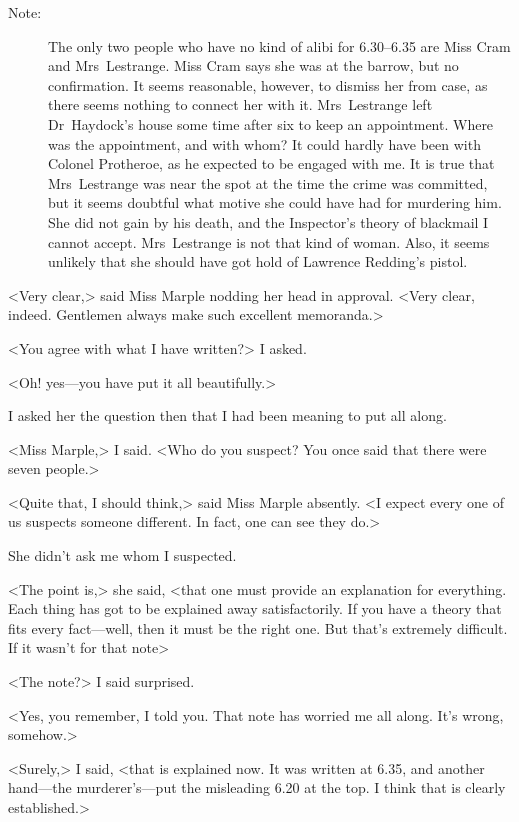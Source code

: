 	\begin{description}
\item[Note:] The only two people who have no kind of alibi for 6.30--6.35 are Miss Cram and Mrs~Lestrange. Miss Cram says she was at the barrow, but no confirmation. It seems reasonable, however, to dismiss her from case, as there seems nothing to connect her with it. Mrs~Lestrange left Dr~Haydock's house some time after six to keep an appointment. Where was the appointment, and with whom? It could hardly have been with Colonel Protheroe, as he expected to be engaged with me. It is true that Mrs~Lestrange was near the spot at the time the crime was committed, but it seems doubtful what motive she could have had for murdering him. She did not gain by his death, and the Inspector's theory of blackmail I cannot accept. Mrs~Lestrange is not that kind of woman. Also, it seems unlikely that she should have got hold of Lawrence Redding's pistol.
\end{description}

<Very clear,> said Miss Marple nodding her head in approval. <Very clear, indeed. Gentlemen always make such excellent memoranda.>

<You agree with what I have written?> I asked.

<Oh! yes—you have put it all beautifully.>

I asked her the question then that I had been meaning to put all along.

<Miss Marple,> I said. <Who do you suspect? You once said that there were seven people.>

<Quite that, I should think,> said Miss Marple absently. <I expect every one of us suspects someone different. In fact, one can see they do.>

She didn't ask me whom I suspected.

<The point is,> she said, <that one must provide an explanation for everything. Each thing has got to be explained away satisfactorily. If you have a theory that fits every fact—well, then it must be the right one. But that's extremely difficult. If it wasn't for that note\longdash>

<The note?> I said surprised.

<Yes, you remember, I told you. That note has worried me all along. It's wrong, somehow.>

<Surely,> I said, <that is explained now. It was written at 6.35, and another hand—the murderer's—put the misleading 6.20 at the top. I think that is clearly established.>

